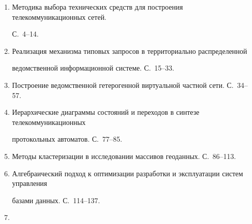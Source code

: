 \begin{enumerate}[1.]


\item {}


Методика выбора технических средств для построения телекоммуникационных сетей. 


С.~4--14.





\item {}


Реализация механизма типовых запросов в территориально распределенной 


ведомственной информационной системе. С.~15--33.





\item {}


Построение ведомственной гетерогенной виртуальной частной сети. С.~34--57.





\item {}


Иерархические диаграммы состояний и переходов в синтезе телекоммуникационных 


протокольных автоматов. С.~77--85.





\item {}


Методы кластеризации в исследовании массивов геоданных. С.~86--113.





\item {}


Ал\-геб\-ра\-и\-че\-ский подход к оптимизации разработки и эксплуатации систем управления 


базами данных. С.~114--137.





\item {}



\end{enumerate}
